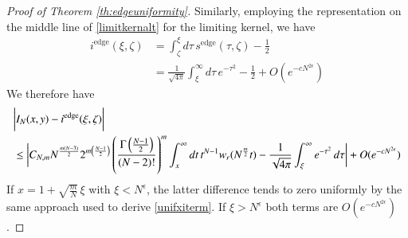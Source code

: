 \documentclass[11pt,reqno]{amsproc}
\numberwithin{equation}{section}
\numberwithin{theorem}{section}
\begin{document}
\begin{proof}[Proof of Theorem \ref{th:edgeuniformity}]
Similarly, employing the representation on the middle line of \eqref{limitkernalt} for the limiting kernel, we have
\begin{align}
i^{\mathrm{edge}}(\xi,\zeta) &= \int_{\zeta}^{\xi}d\tau\,s^{\mathrm{edge}}(\tau,\zeta)-\frac{1}{2}\\
&= \frac{1}{\sqrt{4\pi}}\int_{\xi}^{\infty}d\tau\,e^{-\tau^{2}}-\frac{1}{2}+O(e^{-cN^{2\epsilon}})
\end{align}
We therefore have
\begin{align}
&\bigg{|}I_{N}(x,y)-i^{\mathrm{edge}}(\xi,\zeta)\bigg{|}\\
&\leq \bigg{|}C_{N,m}N^{\frac{m(N-3)}{2}}2^{m\left(\frac{N-1}{2}\right)}\left(\frac{\Gamma\left(\frac{N-1}{2}\right)}{(N-2)!}\right)^{m}\int_{x}^{\infty}dt\,t^{N-1}w_{r}(N^{\frac{m}{2}}t) - \frac{1}{\sqrt{4\pi}}\int_{\xi}^{\infty}e^{-\tau^{2}}\,d\tau\bigg{|} + O(e^{-cN^{2\epsilon}})
\end{align}
If $x = 1+\sqrt{\frac{m}{N}}\,\xi$ with $\xi<N^{\epsilon}$, the latter difference tends to zero uniformly by the same approach used to derive \eqref{unifxiterm}. If $\xi > N^{\epsilon}$ both terms are $O(e^{-cN^{2\epsilon}})$.
\end{proof}
\end{document}
